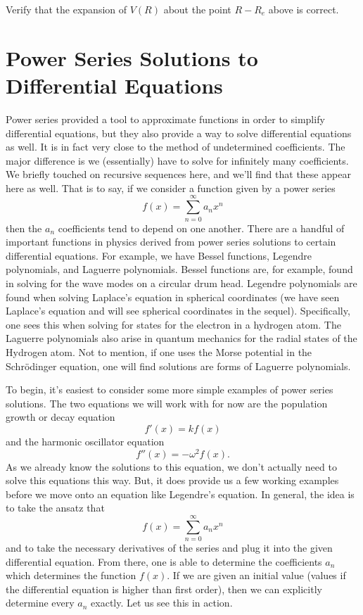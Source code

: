 \begin{exercise}
Verify that the expansion of $V(R)$ about the point $R-R_e$ above is correct.
\end{exercise}

\section{Power Series Solutions to Differential Equations}

Power series provided a tool to approximate functions in order to simplify differential equations, but they also provide a way to solve differential equations as well.  It is in fact very close to the method of undetermined coefficients. The major difference is we (essentially) have to solve for infinitely many coefficients.  We briefly touched on recursive sequences here, and we'll find that these appear here as well. That is to say, if we consider a function given by a power series
\[
f(x) = \sum_{n=0}^\infty a_n x^n
\]
then the $a_n$ coefficients tend to depend on one another.  There are a handful of important functions in physics derived from power series solutions to certain differential equations.  For example, we have Bessel functions, Legendre polynomials, and Laguerre polynomials.  Bessel functions are, for example, found in solving for the wave modes on a circular drum head.  Legendre polynomials are found when solving Laplace's equation in spherical coordinates (we have seen Laplace's equation and will see spherical coordinates in the sequel). Specifically, one sees this when solving for states for the electron in a hydrogen atom.  The Laguerre polynomials also arise in quantum mechanics for the radial states of the Hydrogen atom. Not to mention, if one uses the Morse potential in the Schr\"odinger equation, one will find solutions are forms of Laguerre polynomials.

To begin, it's easiest to consider some more simple examples of power series solutions.  The two equations we will work with for now are the population growth or decay equation
\[
f'(x)=kf(x)
\]
and the harmonic oscillator equation
\[
f''(x)=-\omega^2 f(x).
\]
As we already know the solutions to this equation, we don't actually need to solve this equations this way.  But, it does provide us a few working examples before we move onto an equation like Legendre's equation. In general, the idea is to take the ansatz that
\[
f(x) = \sum_{n=0}^\infty a_n x^n
\]
and to take the necessary derivatives of the series and plug it into the given differential equation.  From there, one is able to determine the coefficients $a_n$ which determines the function $f(x)$.  If we are given an initial value (values if the differential equation is higher than first order), then we can explicitly determine every $a_n$ exactly.  Let us see this in action.

